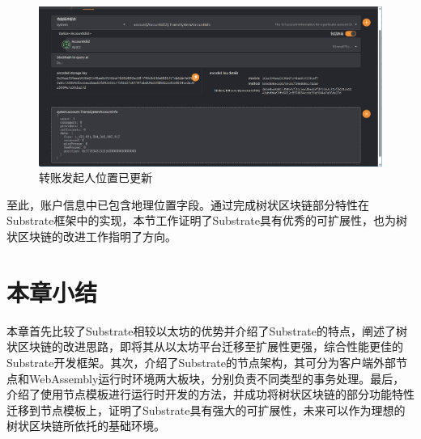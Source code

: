 \begin{figure}[H]
    \centering
    \includegraphics[width=\textwidth]{images/transWithPosResult.png}
    \caption{转账发起人位置已更新}\label{转账发起人位置已更新} %
\end{figure}

至此，账户信息中已包含地理位置字段。通过完成树状区块链部分特性在Substrate框架中的实现，本节工作证明了Substrate具有优秀的可扩展性，也为树状区块链的改进工作指明了方向。

\section{本章小结}

本章首先比较了Substrate相较以太坊的优势并介绍了Substrate的特点，阐述了树状区块链的改进思路，即将其从以太坊平台迁移至扩展性更强，综合性能更佳的Substrate开发框架。其次，介绍了Substrate的节点架构，其可分为客户端外部节点和WebAssembly运行时环境两大板块，分别负责不同类型的事务处理。最后，介绍了使用节点模板进行运行时开发的方法，并成功将树状区块链的部分功能特性迁移到节点模板上，证明了Substrate具有强大的可扩展性，未来可以作为理想的树状区块链所依托的基础环境。
